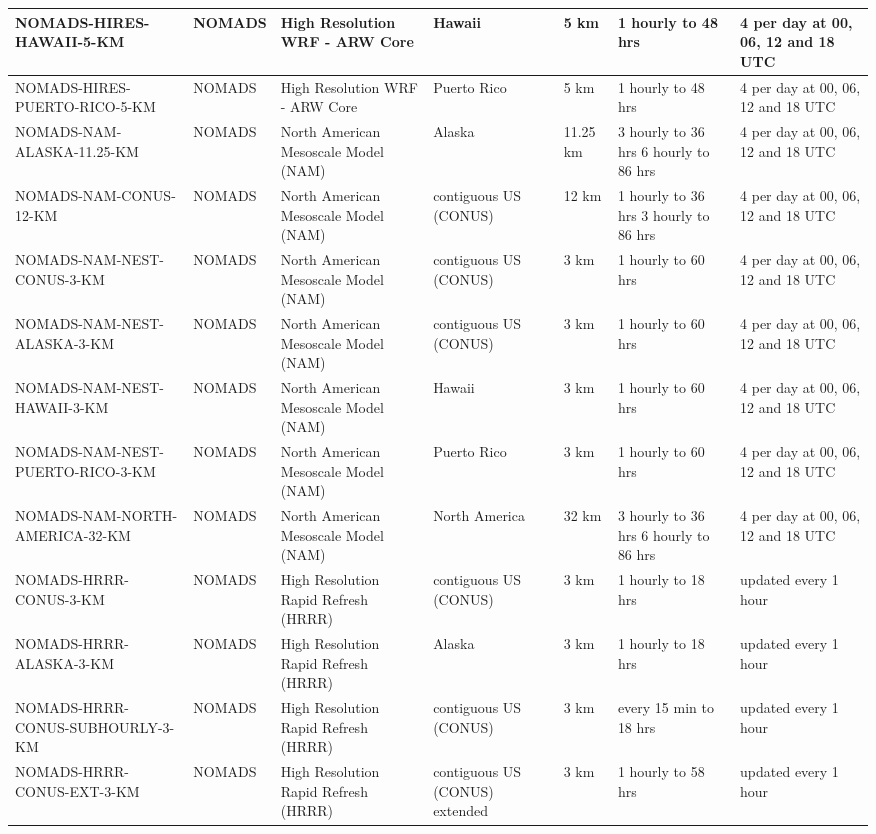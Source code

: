 \documentclass[12pt]{article}
\begin{document}
\begin{landscape}
\begin{longtable}[1]{|p{4.0cm}|p{2.0cm}|p{2.2cm}|p{2.0cm}|p{2.2cm}|p{3.4cm}|p{3.6cm}|}
\hline
NOMADS-HIRES-HAWAII-5-KM & NOMADS & High Resolution WRF - ARW Core & Hawaii & 5 km & 1 hourly to 48 hrs & 4 per day at 00, 06, 12 and 18 UTC\\
\hline
NOMADS-HIRES-PUERTO-RICO-5-KM & NOMADS & High Resolution WRF - ARW Core & Puerto Rico & 5 km & 1 hourly to 48 hrs & 4 per day at 00, 06, 12 and 18 UTC\\
\hline
NOMADS-NAM-ALASKA-11.25-KM & NOMADS & North American Mesoscale Model (NAM) & Alaska & 11.25 km & 3 hourly to 36 hrs 6 hourly to 86 hrs & 4 per day at 00, 06, 12 and 18 UTC\\
\hline
NOMADS-NAM-CONUS-12-KM & NOMADS & North American Mesoscale Model (NAM) & contiguous US (CONUS) & 12 km & 1 hourly to 36 hrs 3 hourly to 86 hrs & 4 per day at 00, 06, 12 and 18 UTC\\
\hline
NOMADS-NAM-NEST-CONUS-3-KM & NOMADS & North American Mesoscale Model (NAM) & contiguous US (CONUS) & 3 km & 1 hourly to 60 hrs & 4 per day at 00, 06, 12 and 18 UTC\\
\hline
NOMADS-NAM-NEST-ALASKA-3-KM & NOMADS & North American Mesoscale Model (NAM) & contiguous US (CONUS) & 3 km & 1 hourly to 60 hrs & 4 per day at 00, 06, 12 and 18 UTC\\
\hline
NOMADS-NAM-NEST-HAWAII-3-KM & NOMADS & North American Mesoscale Model (NAM) & Hawaii & 3 km & 1 hourly to 60 hrs & 4 per day at 00, 06, 12 and 18 UTC\\
\hline
NOMADS-NAM-NEST-PUERTO-RICO-3-KM & NOMADS & North American Mesoscale Model (NAM) & Puerto Rico & 3 km & 1 hourly to 60 hrs & 4 per day at 00, 06, 12 and 18 UTC\\
\hline
NOMADS-NAM-NORTH-AMERICA-32-KM & NOMADS & North American Mesoscale Model (NAM) & North America & 32 km & 3 hourly to 36 hrs 6 hourly to 86 hrs & 4 per day at 00, 06, 12 and 18 UTC\\
\hline
NOMADS-HRRR-CONUS-3-KM & NOMADS & High Resolution Rapid Refresh (HRRR) & contiguous US (CONUS) & 3 km & 1 hourly to 18 hrs & updated every 1 hour\\
\hline
NOMADS-HRRR-ALASKA-3-KM & NOMADS & High Resolution Rapid Refresh (HRRR) & Alaska & 3 km & 1 hourly to 18 hrs & updated every 1 hour\\
\hline
NOMADS-HRRR-CONUS-SUBHOURLY-3-KM & NOMADS & High Resolution Rapid Refresh (HRRR) & contiguous US (CONUS) & 3 km & every 15 min to 18 hrs & updated every 1 hour\\
\hline
NOMADS-HRRR-CONUS-EXT-3-KM & NOMADS & High Resolution Rapid Refresh (HRRR) & contiguous US (CONUS) extended & 3 km & 1 hourly to 58 hrs & updated every 1 hour\\

\end{longtable}
\end{landscape}
\end{document}
